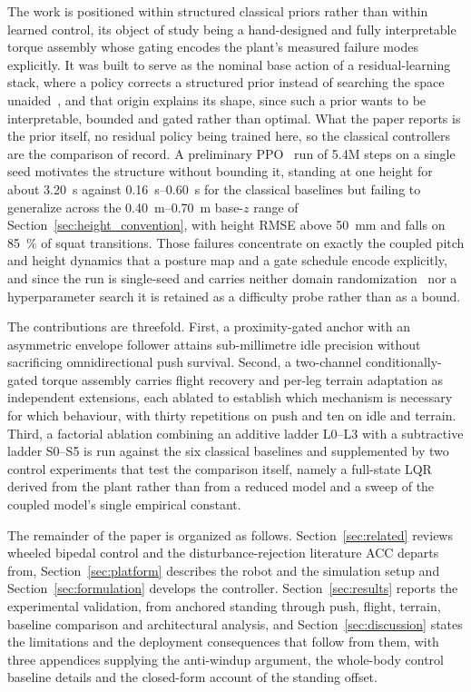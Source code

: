 \documentclass[a4paper,fleqn]{cas-dc}
\begin{document}
The work is positioned within structured classical priors rather than within
learned control, its object of study being a hand-designed and fully
interpretable torque assembly whose gating encodes the plant's measured failure
modes explicitly. It was built to serve as the nominal base action of a
residual-learning stack, where a policy corrects a structured prior instead of
searching the space unaided~\cite{johannink2019residual,silver2018residual}, and
that origin explains its shape, since such a prior wants to be interpretable,
bounded and gated rather than optimal. What the paper reports is the prior
itself, no residual policy being trained here, so the classical controllers are
the comparison of record. A preliminary PPO~\cite{schulman2017ppo} run of 5.4M
steps on a single seed motivates the structure without bounding it, standing at
one height for about \SI{3.20}{s} against \SIrange{0.16}{0.60}{s} for the
classical baselines but failing to generalize across the
\SIrange{0.40}{0.70}{m} base-$z$ range of Section~\ref{sec:height_convention},
with height RMSE above \SI{50}{mm} and falls on \SI{85}{\percent} of squat
transitions. Those failures concentrate on exactly the coupled pitch and height
dynamics that a posture map and a gate schedule encode explicitly, and since the
run is single-seed and carries neither domain
randomization~\cite{tobin2017domainrand,peng2018dynrand} nor a hyperparameter
search it is retained as a difficulty probe rather than as a bound.

The contributions are threefold. First, a proximity-gated anchor with an
asymmetric envelope follower attains sub-millimetre idle precision without
sacrificing omnidirectional push survival. Second, a two-channel
conditionally-gated torque assembly carries flight recovery and per-leg terrain
adaptation as independent extensions, each ablated to establish which mechanism
is necessary for which behaviour, with thirty repetitions on push and ten on
idle and terrain. Third, a factorial ablation combining an additive ladder
L0--L3 with a subtractive ladder S0--S5 is run against the six classical
baselines and supplemented by two control experiments that test the comparison
itself, namely a full-state LQR derived from the plant rather than from a
reduced model and a sweep of the coupled model's single empirical constant.

The remainder of the paper is organized as follows.
Section~\ref{sec:related} reviews wheeled bipedal control and the
disturbance-rejection literature ACC departs from, Section~\ref{sec:platform}
describes the robot and the simulation setup and Section~\ref{sec:formulation}
develops the controller. Section~\ref{sec:results} reports the experimental
validation, from anchored standing through push, flight, terrain, baseline
comparison and architectural analysis, and Section~\ref{sec:discussion} states
the limitations and the deployment consequences that follow from them, with three
appendices supplying the anti-windup argument, the whole-body control baseline
details and the closed-form account of the standing offset.
\end{document}
